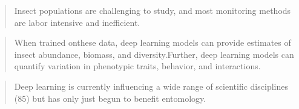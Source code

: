 \documentclass[12pt]{article}
\begin{document}
\begin{quote}
    \cite{hoye_2021_deep} Insect populations are challenging to study, and most
    monitoring methods are labor intensive and inefficient.
\end{quote}

\begin{quote}
    \cite{hoye_2021_deep} When trained onthese data, deep learning models can
    provide estimates of insect abundance, biomass, and diversity.Further, deep
    learning models can quantify variation in phenotypic traits, behavior, and
    interactions.
\end{quote}

\begin{quote}
    \cite{hoye_2021_deep} Deep learning is currently influencing a wide range of
    scientific disciplines (85) but has only just begun to benefit entomology.
\end{quote}



\end{document}

